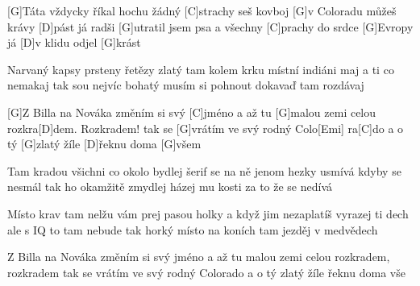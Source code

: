 
[G]Táta vždycky říkal hochu žádný [C]strachy
seš kovboj [G]v Coloradu můžeš krávy [D]pást
já radši [G]utratil jsem psa a všechny [C]prachy
do srdce [G]Evropy já [D]v klidu odjel [G]krást

Narvaný kapsy prsteny řetězy zlatý
tam kolem krku místní indiáni maj
a ti co nemakaj tak sou nejvíc bohatý
musím si pohnout dokavaď tam rozdávaj

[G]Z Billa na Nováka změním si svý [C]jméno
a až tu [G]malou zemi celou rozkra[D]dem. Rozkradem!
tak se [G]vrátím ve svý rodný Colo[Emi] ra[C]do
a o tý [G]zlatý žíle [D]\null řeknu doma [G]všem


	Tam kradou všichni co okolo bydlej
	šerif se na ně jenom hezky usmívá
	kdyby se nesmál tak ho okamžitě zmydlej
	házej mu kosti za to že se nedívá
	
	Místo krav tam nelžu vám prej pasou holky
	a když jim nezaplatíš vyrazej ti dech
	ale s IQ to tam nebude tak horký
	místo na koních tam jezděj v medvědech

	Z Billa na Nováka změním si svý jméno
	a až tu malou zemi celou rozkradem, rozkradem
	tak se vrátím ve svý rodný Colorado
	a o tý zlatý žíle řeknu doma vše